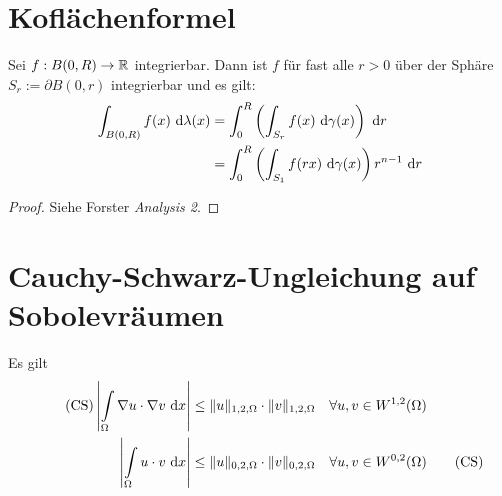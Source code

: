 \section{Koflächenformel}
\begin{satz}
	Sei $f:B(0,R)\rightarrow \mathbb{R}$ integrierbar. 
	Dann ist $f$ für fast alle $r>0$ über der Sphäre $S_r := \partial B(0,r)$ integrierbar und es gilt:
	\begin{align*}
		\int_{B(0,R)}f(x) \text{ d}\lambda(x) &= \int_0^R \left(\int_{S_r} f(x) \text{ d}\gamma(x)\right) \text{ d} r \\
																	 &= \int_0^R \left(\int_{S_1} f(rx) \text{ d}\gamma(x)\right)r^{n-1} \text{ d} r
	\end{align*}
\end{satz}

\begin{proof}
	Siehe Forster \textit{Analysis 2}.
\end{proof}

\section{Cauchy-Schwarz-Ungleichung auf Sobolevräumen}
Es gilt
\begin{align}\label{eqCS}\tag{CS}
	\left|\int\limits_\Omega\nabla u\cdot\nabla v\text{ d} x\right|
	&\leq\Vert u\Vert_{1,2,\Omega}\cdot\Vert v\Vert_{1,2,\Omega}
	&\forall& u,v\in W^{1,2}(\Omega)\\
	\left|\int\limits_\Omega u\cdot v\text{ d} x\right|&\leq\Vert u\Vert_{0,2,\Omega}\cdot\Vert v\Vert_{0,2,\Omega}
	&\forall& u,v\in W^{0,2}(\Omega)\label{eqCSW02}\tag{CS}
\end{align}

